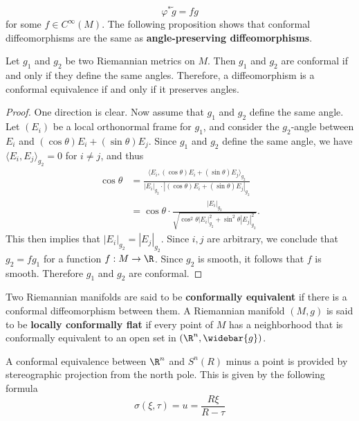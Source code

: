 \[\varphi^*\tilde{g}=fg\]
for some $f\in C^{\infty}(M)$. The following proposition shows that conformal diffeomorphisms 
are the same as \textbf{angle-preserving diffeomorphisms}.
\begin{proposition}
Let $g_1$ and $g_2$ be two Riemannian metrics on $M$. Then $g_1$ and $g_2$ are conformal if and only if they define the same angles. Therefore, a diffeomorphism is a conformal equivalence if and only if it preserves angles.
\end{proposition}
\begin{proof}
One direction is clear. Now assume that $g_1$ and $g_2$ define the same angle. Let $(E_i)$ be a local orthonormal frame for $g_1$, and consider the $g_2$-angle between $E_i$ and $(\cos\theta)E_i+(\sin\theta)E_j$. Since $g_1$ and $g_2$ define the same angle, we have $\langle E_i,E_j\rangle_{g_2}=0$ for $i\neq j$, and thus
\begin{align*}
\cos\theta&=\frac{\langle E_i,(\cos\theta)E_i+(\sin\theta)E_j\rangle_{g_2}}{|E_i|_{g_2}\cdot|(\cos\theta)E_i+(\sin\theta)E_j|_{g_2}}\\
&=\cos\theta\cdot\frac{|E_i|_{g_2}}{\sqrt{\cos^2\theta|E_i|_{g_2}^2+\sin^2\theta|E_j|_{g_2}^2}}.
\end{align*}
This then implies that $|E_i|_{g_2}=|E_j|_{g_2}$. Since $i,j$ are arbitrary, we conclude that $g_2=fg_1$ for a function $f:M\to\R$. Since $g_2$ is smooth, it follows that $f$ is smooth. Therefore $g_1$ and $g_2$ are conformal.
\end{proof}
Two Riemannian manifolds are said to be \textbf{conformally equivalent} if there is a conformal diffeomorphism between them. A Riemannian manifold $(M,g)$ is said to be \textbf{locally conformally flat} if every point of $M$ has a neighborhood that is conformally equivalent to an open set in $(\R^n,\widebar{g})$.\par
A conformal equivalence between $\R^n$ and $S^n(R)$ minus a point is provided by stereographic projection from the north pole. This is given by the following formula
\[\sigma(\xi,\tau)=u=\frac{R\xi}{R-\tau}\]
